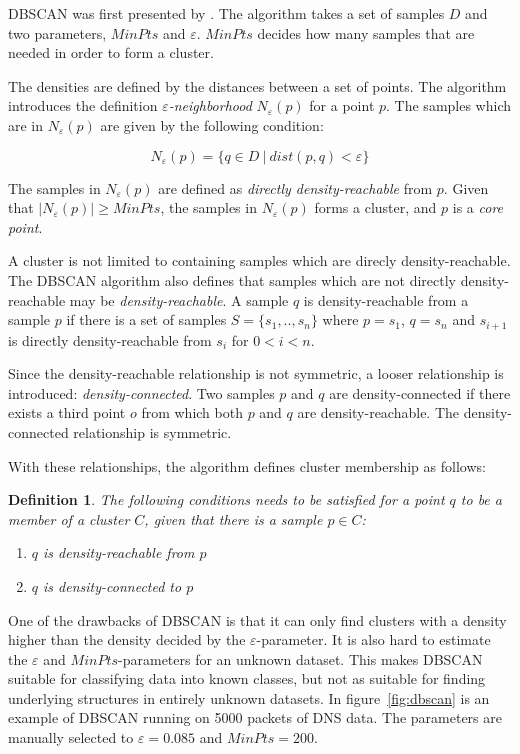 \documentclass[a4paper]{report}
\newtheorem*{definition}{Definition}
\begin{document}
DBSCAN was first presented by \citet{ester96}. The algorithm takes a set of 
samples $D$ and two parameters, $MinPts$ and $\varepsilon$. $MinPts$ decides
how many samples that are needed in order to form a cluster.

The densities are defined by the distances between a set of points.
The algorithm introduces the definition \emph{$\varepsilon$-neighborhood}
$N_{\varepsilon}(p)$ for a point $p$. The samples which are in 
$N_{\varepsilon}(p)$ are given by the following condition:

\begin{equation}
    N_{\varepsilon}(p) = \{ q \in D ~|~ dist(p,q) < \varepsilon  \}
    \label{eq:eps}
\end{equation}

The samples in $N_{\varepsilon}(p)$ are defined as
\emph{directly density-reachable} from $p$. Given that
$|N_{\varepsilon}(p)| \ge MinPts$, the samples in $N_{\varepsilon}(p)$ forms a
cluster, and $p$ is a \emph{core point}. 

A cluster is not limited to containing samples which are direcly
density-reachable. The DBSCAN algorithm also defines that samples which are
not directly density-reachable may be \emph{density-reachable}.
A sample $q$ is density-reachable from a sample $p$ if there is a set of samples
$S = \{s_1, .., s_n\}$ where $p = s_1$, $q = s_n$ and $s_{i+1}$ is directly
density-reachable from $s_i$ for $0 < i < n$.

Since the density-reachable relationship is not symmetric, a looser
relationship is introduced: \emph{density-connected}. Two samples $p$ and
$q$ are density-connected if there exists a third point $o$ from which both
$p$ and $q$ are density-reachable. The density-connected relationship
is symmetric.

With these relationships, the algorithm defines cluster membership as
follows:

\begin{definition}
    The following conditions needs to be satisfied for a point $q$ to be a
    member of a cluster $C$, given that there is a sample $p \in C$:
    \begin{enumerate}
        \item $q$ is density-reachable from $p$
        \item $q$ is density-connected to $p$
    \end{enumerate}
\end{definition}

One of the drawbacks of DBSCAN is that it can only find clusters with a density
higher than the density decided by the $\varepsilon$-parameter. It is also hard
to estimate the $\varepsilon$ and $MinPts$-parameters for an unknown dataset.
This makes DBSCAN suitable for classifying data into known classes, but not as
suitable for finding underlying structures in entirely unknown datasets. In
figure~\ref{fig:dbscan} is an example of DBSCAN running on 5000 packets of DNS
data. The parameters are manually selected to $\varepsilon = 0.085$ and
$MinPts = 200$.
\end{document}
